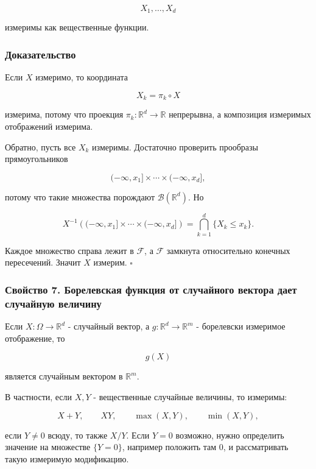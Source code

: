 \documentclass[
  11pt,
  a4paper,
]{article}
\begin{document}
\[
X_1,\ldots,X_d
\]

измеримы как вещественные функции.

\subsubsection{Доказательство}\label{ux434ux43eux43aux430ux437ux430ux442ux435ux43bux44cux441ux442ux432ux43e-4}

Если \(X\) измеримо, то координата

\[
X_k=\pi_k\circ X
\]

измерима, потому что проекция \(\pi_k:\mathbb R^d\to\mathbb R\)
непрерывна, а композиция измеримых отображений измерима.

Обратно, пусть все \(X_k\) измеримы. Достаточно проверить прообразы
прямоугольников

\[
(-\infty,x_1]\times\cdots\times(-\infty,x_d],
\]

потому что такие множества порождают \(\mathcal B(\mathbb R^d)\). Но

\[
X^{-1}\left((-\infty,x_1]\times\cdots\times(-\infty,x_d]\right)
=
\bigcap_{k=1}^d\{X_k\le x_k\}.
\]

Каждое множество справа лежит в \(\mathcal F\), а \(\mathcal F\)
замкнута относительно конечных пересечений. Значит \(X\) измерим.
\(\square\)

\subsubsection{Свойство 7. Борелевская функция от случайного вектора
дает случайную
величину}\label{ux441ux432ux43eux439ux441ux442ux432ux43e-7.-ux431ux43eux440ux435ux43bux435ux432ux441ux43aux430ux44f-ux444ux443ux43dux43aux446ux438ux44f-ux43eux442-ux441ux43bux443ux447ux430ux439ux43dux43eux433ux43e-ux432ux435ux43aux442ux43eux440ux430-ux434ux430ux435ux442-ux441ux43bux443ux447ux430ux439ux43dux443ux44e-ux432ux435ux43bux438ux447ux438ux43dux443}

Если \(X:\Omega\to\mathbb R^d\) - случайный вектор, а
\(g:\mathbb R^d\to\mathbb R^m\) - борелевски измеримое отображение, то

\[
g(X)
\]

является случайным вектором в \(\mathbb R^m\).

В частности, если \(X,Y\) - вещественные случайные величины, то
измеримы:

\[
X+Y,\qquad XY,\qquad \max(X,Y),\qquad \min(X,Y),
\]

если \(Y\ne0\) всюду, то также \(X/Y\). Если \(Y=0\) возможно, нужно
определить значение на множестве \(\{Y=0\}\), например положить там
\(0\), и рассматривать такую измеримую модификацию.
\end{document}
